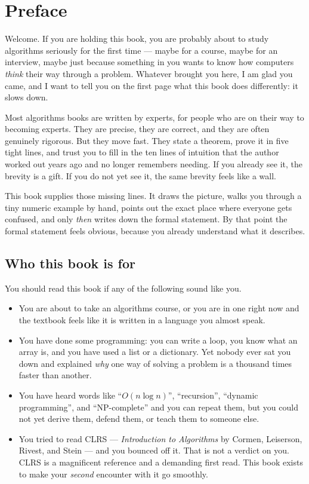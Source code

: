 \chapter*{Preface}

Welcome. If you are holding this book, you are probably about to study
algorithms seriously for the first time --- maybe for a course, maybe for an
interview, maybe just because something in you wants to know how computers
\emph{think} their way through a problem. Whatever brought you here, I
am glad you came, and I want to tell you on the first page what this book
does differently: it slows down.

Most algorithms books are written by experts, for people who are on their way
to becoming experts. They are precise, they are correct, and they are often
genuinely rigorous. But they move fast. They state a theorem, prove it in five
tight lines, and trust you to fill in the ten lines of intuition that the author
worked out years ago and no longer remembers needing. If you already see it, the
brevity is a gift. If you do not yet see it, the same brevity feels like a wall.

This book supplies those missing lines. It draws the picture, walks you
through a tiny numeric example by hand, points out the exact place where
everyone gets confused, and only \emph{then} writes down the formal statement.
By that point the formal statement feels obvious, because you already
understand what it describes.

\chapterline

\section*{Who this book is for}

You should read this book if any of the following sound like you.

\begin{itemize}
  \item You are about to take an algorithms course, or you are in one right now
        and the textbook feels like it is written in a language you almost speak.
  \item You have done some programming: you can write a loop, you know what an
        array is, and you have used a list or a dictionary. Yet nobody ever sat you
        down and explained \emph{why} one way of solving a problem is a thousand
        times faster than another.
  \item You have heard words like ``$O(n \log n)$'', ``recursion'', ``dynamic
        programming'', and ``NP-complete'' and you can repeat them, but you could
        not yet derive them, defend them, or teach them to someone else.
  \item You tried to read CLRS --- \emph{Introduction to Algorithms} by Cormen,
        Leiserson, Rivest, and Stein --- and you bounced off it. That is not a
        verdict on you. CLRS is a magnificent reference and a demanding first
        read. This book exists to make your \emph{second} encounter with it go
        smoothly.
\end{itemize}

